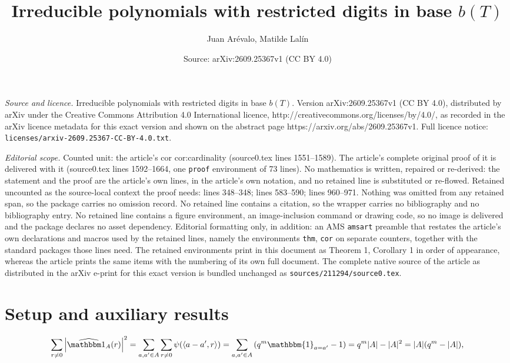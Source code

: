 \documentclass[10pt,a4paper]{amsart}
\title{Irreducible polynomials with restricted digits in base $b(T)$}
\author{Juan Ar\'evalo, Matilde Lal\'in}
\date{Source: arXiv:2609.25367v1 (CC BY 4.0)}
\begin{document}
\maketitle

\noindent\emph{Source and licence.} Irreducible polynomials with restricted digits in base $b(T)$. Version arXiv:2609.25367v1 (CC BY 4.0), distributed by arXiv under the Creative Commons Attribution 4.0 International licence, http://creativecommons.org/licenses/by/4.0/, as recorded in the arXiv licence metadata for this exact version and shown on the abstract page https://arxiv.org/abs/2609.25367v1. Full licence notice: \texttt{licenses/arxiv-2609.25367-CC-BY-4.0.txt}.\par\smallskip

\noindent\textit{Editorial scope.} Counted unit: the article's cor cor:cardinality (source0.tex lines 1551--1589). The article's complete original proof of it is delivered with it (source0.tex lines 1592--1664, one \texttt{proof} environment of 73 lines). No mathematics is written, repaired or re-derived: the statement and the proof are the article's own lines, in the article's own notation, and no retained line is substituted or re-flowed.  Retained uncounted as the source-local context the proof needs: lines 348--348; lines 583--590; lines 960--971.  Nothing was omitted from any retained span, so the package carries no omission record.  No retained line contains a citation, so the wrapper carries no bibliography and no bibliography entry.  No retained line contains a figure environment, an image-inclusion command or drawing code, so no image is delivered and the package declares no asset dependency.  Editorial formatting only, in addition: an AMS \texttt{amsart} preamble that restates the article's own declarations and macros used by the retained lines, namely the environments \texttt{thm}, \texttt{cor} on separate counters, together with the standard packages those lines need.  The retained environments print in this document as Theorem 1, Corollary 1 in order of appearance, whereas the article prints the same items with the numbering of its own full document.  The complete native source of the article as distributed in the arXiv e-print for this exact version is bundled unchanged as \texttt{sources/211294/source0.tex}.
\section{Setup and auxiliary results}\label{sec:setup}

\begin{equation}\label{eq:Parseval}
\sum_{r\neq0}
\left|\widehat{\mathbbm 1_A}(r)\right|^2
=\sum_{a,a'\in A} \sum_{r\not =0}\psi(\langle a-a',r\rangle)=
\sum_{a,a'\in A}\left(q^m\mathbbm{1}_{a=a'}-1\right)
=q^m|A|-|A|^2=
|A|(q^m-|A|),
\end{equation}
\end{document}
